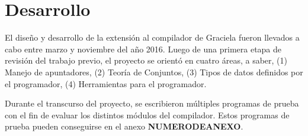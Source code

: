 \chapter{Desarrollo}
\label{capitulo3}

El diseño y desarrollo de la extensión al compilador de Graciela fueron llevados
a cabo entre marzo y noviembre del año 2016. Luego de una primera etapa de
revisión del trabajo previo, el proyecto se orientó en cuatro áreas, a saber,
(1) Manejo de apuntadores, (2) Teoría de Conjuntos, (3) Tipos de datos definidos
por el programador, (4) Herramientas para el programador.

Durante el transcurso del proyecto, se escribieron múltiples programas de prueba
con el fin de evaluar los distintos módulos del compilador. Estos programas de
prueba pueden conseguirse en el anexo \textbf{NUMERODEANEXO}.

%
%

